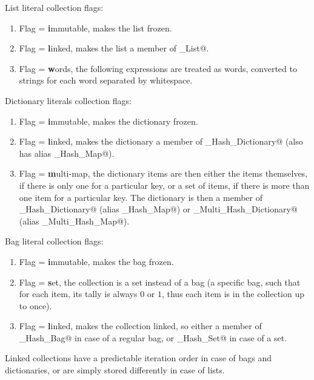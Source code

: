List literal collection flags: 

\begin{enumerate}
\item Flag \lstinline@i@ = \textbf{i}mmutable, makes the list frozen. 
\item Flag \lstinline@l@ = \textbf{l}inked, makes the list a member of \lstinline@Linked_List@. 
\item Flag \lstinline@w@ = \textbf{w}ords, the following expressions are treated as words, converted to strings for each word separated by whitespace. 
\end{enumerate}

Dictionary literals collection flags:

\begin{enumerate}
\item Flag \lstinline@i@ = \textbf{i}mmutable, makes the dictionary frozen. 
\item Flag \lstinline@l@ = \textbf{l}inked, makes the dictionary a member of \lstinline@Linked_Hash_Dictionary@ (also has alias \lstinline@Linked_Hash_Map@).
\item Flag \lstinline@m@ = \textbf{m}ulti-map, the dictionary items are then either the items themselves, if there is only one for a particular key, or a set of items, if there is more than one item for a particular key. The dictionary is then a member of \lstinline@Multi_Hash_Dictionary@ (alias \lstinline@Multi_Hash_Map@) or \lstinline@Linked_Multi_Hash_Dictionary@ (alias \lstinline@Linked_Multi_Hash_Map@). 
\end{enumerate}

Bag literal collection flags:

\begin{enumerate}
\item Flag \lstinline@i@ = \textbf{i}mmutable, makes the bag frozen. 
\item Flag \lstinline@s@ = \textbf{s}et, the collection is a set instead of a bag (a specific bag, such that for each item, its tally is always $0$ or $1$, thus each item is in the collection up to once). 
\item Flag \lstinline@l@ = \textbf{l}inked, makes the collection linked, so either a member of \lstinline@Linked_Hash_Bag@ in case of a regular bag, or \lstinline@Linked_Hash_Set@ in case of a set. 
\end{enumerate}

Linked collections have a predictable iteration order in case of bags and dictionaries, or are simply stored differently in case of lists.  

